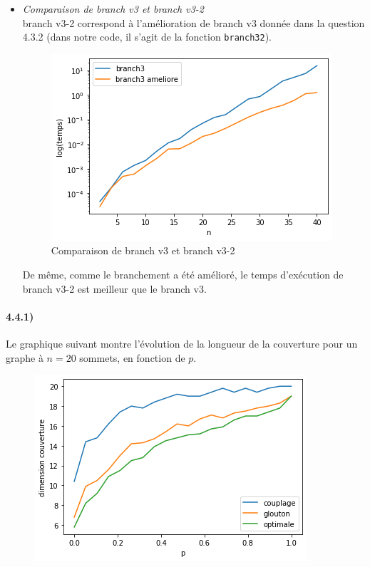\documentclass[12pt]{article}
\begin{document}
\begin{itemize}
            \item \textit{Comparaison de branch v3 et branch v3-2} \\
                branch v3-2 correspond à l'amélioration de branch v3 donnée dans la question 4.3.2 (dans notre code, il s'agit de la fonction \texttt{branch32}).
            \begin{figure}[H]
                \caption{Comparaison de branch v3 et branch v3-2}
                \includegraphics[scale=0.6]{figures/branch3-3amel.png}
                \centering
            \end{figure}
            De même, comme le branchement a été amélioré, le temps d'exécution de branch v3-2 est meilleur que le branch v3.
            
        \end{itemize}

    \paragraph{4.4.1)}
        Le graphique suivant montre l'évolution de la longueur de la couverture pour un graphe à $n=20$ sommets, en fonction de $p$.

        \begin{figure}[H]
            \includegraphics[scale=0.6]{figures/qualite_pvar.png}
            \centering
        \end{figure}
\end{document}
